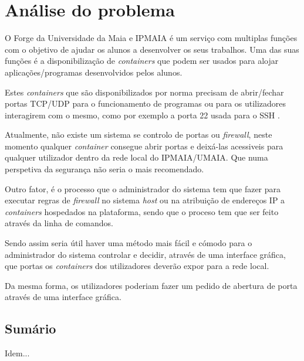 \chapter{Análise do problema}
\label{cap:problem}


O Forge da Universidade da Maia e IPMAIA é um serviço com multiplas funções com 
o objetivo de ajudar os alunos a desenvolver os seus trabalhos.
Uma das suas funções é a disponibilização de \textit{containers} que podem ser usados
para alojar aplicações/programas desenvolvidos pelos alunos.

Estes \textit{containers} que são disponibilizados por norma precisam de 
abrir/fechar portas TCP/UDP para o funcionamento de programas ou para os
utilizadores interagirem com o mesmo, como por exemplo a porta 22 usada para o 
SSH \cite{rfc4253}.

Atualmente, não existe um sistema se controlo de portas ou \textit{firewall}, neste
momento qualquer \textit{container} consegue abrir portas e deixá-las acessiveis 
para qualquer utilizador dentro da rede local do IPMAIA/UMAIA. Que numa perspetiva
da segurança não seria o mais recomendado.

Outro fator, é o processo que o administrador do sistema tem que fazer para executar regras
de \textit{firewall} no sistema \textit{host} ou na atribuição de endereços IP a \textit{containers}
hospedados na plataforma, sendo que o proceso tem que ser feito através da linha de comandos.

Sendo assim seria útil haver uma método mais fácil e cómodo para o administrador do sistema
controlar e decidir, através de uma interface gráfica, que portas os \textit{containers} dos utilizadores deverão expor 
para a rede local.

Da mesma forma, os utilizadores poderiam fazer um pedido de abertura de porta 
através de uma interface gráfica.

\section*{Sumário}

Idem... 
